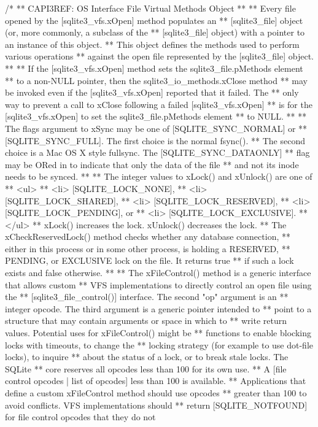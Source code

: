 \begin{Codex}[label=sqlite3.h,numbers=left]
{/*
** CAPI3REF: OS Interface File Virtual Methods Object
**
** Every file opened by the [sqlite3_vfs.xOpen] method populates an
** [sqlite3_file] object (or, more commonly, a subclass of the
** [sqlite3_file] object) with a pointer to an instance of this object.
** This object defines the methods used to perform various operations
** against the open file represented by the [sqlite3_file] object.
**
** If the [sqlite3_vfs.xOpen] method sets the sqlite3_file.pMethods element 
** to a non-NULL pointer, then the sqlite3_io_methods.xClose method
** may be invoked even if the [sqlite3_vfs.xOpen] reported that it failed.  The
** only way to prevent a call to xClose following a failed [sqlite3_vfs.xOpen]
** is for the [sqlite3_vfs.xOpen] to set the sqlite3_file.pMethods element
** to NULL.
**
** The flags argument to xSync may be one of [SQLITE_SYNC_NORMAL] or
** [SQLITE_SYNC_FULL].  The first choice is the normal fsync().
** The second choice is a Mac OS X style fullsync.  The [SQLITE_SYNC_DATAONLY]
** flag may be ORed in to indicate that only the data of the file
** and not its inode needs to be synced.
**
** The integer values to xLock() and xUnlock() are one of
** <ul>
** <li> [SQLITE_LOCK_NONE],
** <li> [SQLITE_LOCK_SHARED],
** <li> [SQLITE_LOCK_RESERVED],
** <li> [SQLITE_LOCK_PENDING], or
** <li> [SQLITE_LOCK_EXCLUSIVE].
** </ul>
** xLock() increases the lock. xUnlock() decreases the lock.
** The xCheckReservedLock() method checks whether any database connection,
** either in this process or in some other process, is holding a RESERVED,
** PENDING, or EXCLUSIVE lock on the file.  It returns true
** if such a lock exists and false otherwise.
**
** The xFileControl() method is a generic interface that allows custom
** VFS implementations to directly control an open file using the
** [sqlite3_file_control()] interface.  The second "op" argument is an
** integer opcode.  The third argument is a generic pointer intended to
** point to a structure that may contain arguments or space in which to
** write return values.  Potential uses for xFileControl() might be
** functions to enable blocking locks with timeouts, to change the
** locking strategy (for example to use dot-file locks), to inquire
** about the status of a lock, or to break stale locks.  The SQLite
** core reserves all opcodes less than 100 for its own use.
** A [file control opcodes | list of opcodes] less than 100 is available.
** Applications that define a custom xFileControl method should use opcodes
** greater than 100 to avoid conflicts.  VFS implementations should
** return [SQLITE_NOTFOUND] for file control opcodes that they do not
}
\end{Codex}
